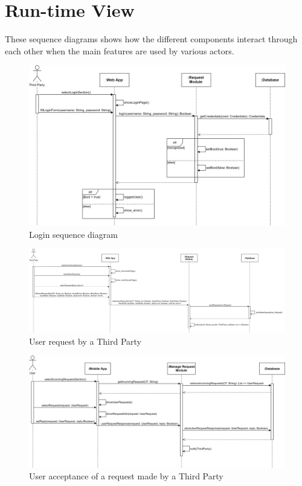 \section{Run-time View}
These sequence diagrams shows how the different components interact through each other when the main features are used by various actors.

\begin{figure}[H]
    \centering
    \includegraphics[scale=0.35]{./Pictures/login.png}
    \caption{Login sequence diagram}
\end{figure}

\begin{figure}[H]
    \centering
    \includegraphics[scale=0.35]{./Pictures/userRequest.png}
    \caption{User request by a Third Party}
\end{figure}

\begin{figure}[H]
    \centering
    \includegraphics[scale=0.35]{./Pictures/acceptRequest.png}
    \caption{User acceptance of a request made by a Third Party}
\end{figure}


